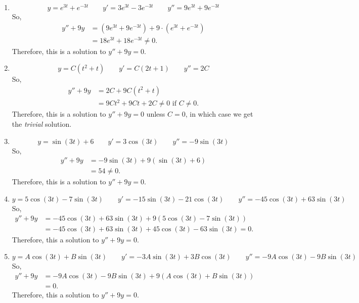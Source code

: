 \documentclass[handout, instructornotes]{ximera}
\begin{document}
	\begin{freeResponse}
	\begin{enumerate}
	
	\item  \[ y = e^{3t}+e^{-3t} 	\qquad	y'=3e^{3t}-3e^{-3t} 	\qquad	y''=9e^{3t}+9e^{-3t} \]  
	So,
		\begin{align*}
		y''+9y &= (9e^{3t}+9e^{-3t}) + 9\cdot (e^{3t}+e^{-3t})  \\
		&= 18e^{3t} + 18e^{-3t} \neq 0.
		\end{align*}
	Therefore, this is  a solution to $y''+9y=0$.
	
	
	
	\item  \[ y = C(t^2+t) 	\qquad	y'=C(2t+1) 	\qquad	y''=2C \] 
	So,
		\begin{align*}
		y''+9y &= 2C + 9C(t^2+t)  \\
		&= 9Ct^2 + 9Ct + 2C \neq 0 \text{ if } C \neq 0.
		\end{align*}
	Therefore, this is  a solution to $y''+9y=0$ unless $C=0$, in which case we get the {\it trivial} solution.
	
	
	
	\item  \[ y = \sin(3t)+6 	\qquad	y'=3\cos(3t) 	\qquad	y''=-9\sin(3t) \]  
	So,
		\begin{align*}
		y''+9y 
		&= -9\sin(3t) +9(\sin(3t) + 6)  \\
		&= 54 \neq 0.
		\end{align*}
	Therefore, this is  a solution to $y''+9y=0$.
	
	
	
	\item  \[ y = 5\cos(3t)-7\sin(3t) 	\qquad	y'=-15\sin(3t)-21\cos(3t) 	\qquad	y''=-45\cos(3t)+63\sin(3t) \]  
	So,
		\begin{align*}
		y''+9y 
		&= -45\cos(3t)+63\sin(3t) +9(5\cos(3t)-7\sin(3t))  \\
		&= -45\cos(3t)+63\sin(3t) + 45\cos(3t) - 63\sin(3t) = 0.
		\end{align*}
	Therefore, this  a solution to $y''+9y=0$.
	
	
	
	\item  \[ y = A\cos(3t)+B\sin(3t) 	\qquad	y'=-3A\sin(3t)+3B\cos(3t) 	\qquad	y''=-9A\cos(3t)-9B\sin(3t) \]  
	So,
		\begin{align*}
		y''+9y 
		&= -9A\cos(3t)-9B\sin(3t) +9(A\cos(3t)+B\sin(3t))  \\
		&= 0.
		\end{align*}
	Therefore, this  a solution to $y''+9y=0$.
	
	\end{enumerate}
	\end{freeResponse}
	
\end{document}
